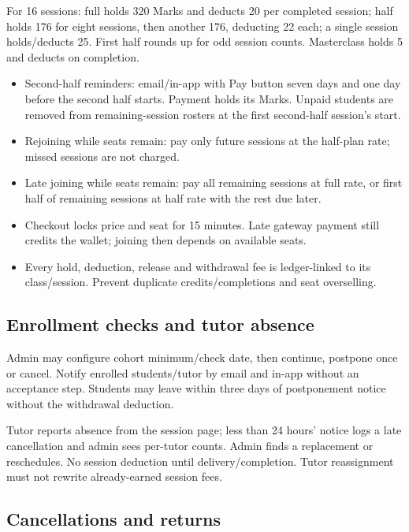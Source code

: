\documentclass[11pt,a4paper]{article}
\begin{document}
For 16 sessions: full holds 320 Marks and deducts 20 per completed session; half holds 176 for eight sessions, then another 176, deducting 22 each; a single session holds/\allowbreak{}deducts 25. First half rounds up for odd session counts. Masterclass holds 5 and deducts on completion.

\begin{itemize}
\item Second-half reminders: email/\allowbreak{}in-app with Pay button seven days and one day before the second half starts. Payment holds its Marks. Unpaid students are removed from remaining-session rosters at the first second-half session's start.
\item Rejoining while seats remain: pay only future sessions at the half-plan rate; missed sessions are not charged.
\item Late joining while seats remain: pay all remaining sessions at full rate, or first half of remaining sessions at half rate with the rest due later.
\item Checkout locks price and seat for 15 minutes. Late gateway payment still credits the wallet; joining then depends on available seats.
\item Every hold, deduction, release and withdrawal fee is ledger-linked to its class/\allowbreak{}session. Prevent duplicate credits/\allowbreak{}completions and seat overselling.
\end{itemize}

\subsection*{Enrollment checks and tutor absence}

Admin may configure cohort minimum/\allowbreak{}check date, then continue, postpone once or cancel. Notify enrolled students/\allowbreak{}tutor by email and in-app without an acceptance step. Students may leave within three days of postponement notice without the withdrawal deduction.

Tutor reports absence from the session page; less than 24 hours' notice logs a late cancellation and admin sees per-tutor counts. Admin finds a replacement or reschedules. No session deduction until delivery/\allowbreak{}completion. Tutor reassignment must not rewrite already-earned session fees.

\subsection*{Cancellations and returns}
\end{document}
